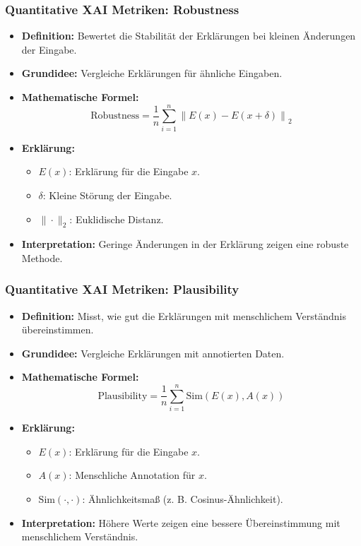 \documentclass[aspectratio=1610, xcolor=dvipsnames, 9pt]{beamer}
\begin{document}
\begin{frame}
  \frametitle{Quantitative XAI Metriken: Robustness}
  \begin{itemize}
    \item \textbf{Definition:} Bewertet die Stabilität der Erklärungen bei kleinen Änderungen der Eingabe.
    \item \textbf{Grundidee:} Vergleiche Erklärungen für ähnliche Eingaben.
    \item \textbf{Mathematische Formel:}
    \[
    \text{Robustness} = \frac{1}{n} \sum_{i=1}^n \left\| E(x) - E(x + \delta) \right\|_2
    \]
    \item \textbf{Erklärung:}
    \begin{itemize}
      \item $E(x)$: Erklärung für die Eingabe $x$.
      \item $\delta$: Kleine Störung der Eingabe.
      \item $\|\cdot\|_2$: Euklidische Distanz.
    \end{itemize}
    \item \textbf{Interpretation:} Geringe Änderungen in der Erklärung zeigen eine robuste Methode.
  \end{itemize}
\end{frame}

\begin{frame}
  \frametitle{Quantitative XAI Metriken: Plausibility}
  \begin{itemize}
    \item \textbf{Definition:} Misst, wie gut die Erklärungen mit menschlichem Verständnis übereinstimmen.
    \item \textbf{Grundidee:} Vergleiche Erklärungen mit annotierten Daten.
    \item \textbf{Mathematische Formel:}
    \[
    \text{Plausibility} = \frac{1}{n} \sum_{i=1}^n \text{Sim}(E(x), A(x))
    \]
    \item \textbf{Erklärung:}
    \begin{itemize}
      \item $E(x)$: Erklärung für die Eingabe $x$.
      \item $A(x)$: Menschliche Annotation für $x$.
      \item $\text{Sim}(\cdot, \cdot)$: Ähnlichkeitsmaß (z. B. Cosinus-Ähnlichkeit).
    \end{itemize}
    \item \textbf{Interpretation:} Höhere Werte zeigen eine bessere Übereinstimmung mit menschlichem Verständnis.
  \end{itemize}
\end{frame}
\end{document}
